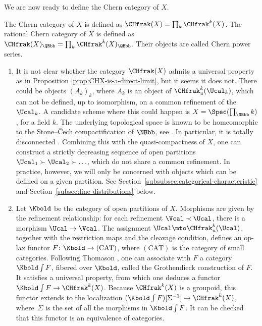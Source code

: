 We are now ready to define the Chern category of $X$.

\begin{definition}
The Chern category of $X$ is defined as $\CHfrak(X)=\prod_{k}\CHfrak^{k}(X)$. The rational Chern category of $X$ is defined as $\CHfrak(X)_{\QBbb}=\prod_{k}\CHfrak^{k}(X)_{\QBbb}$. Their objects are called Chern power series.
\end{definition}

\skpt
\begin{remark}\label{rmk:Grothendieck-construction}
\begin{enumerate}
\item\label{item:Grothendieck-construction-1} It is not clear whether the category $\CHfrak(X)$ admits a universal property as in Proposition \ref{prop:CHX-is-a-direct-limit}, but it seems it does not. There could be objects $(A_{k})_{k}$, where $A_{k}$ is an object of $\CHfrak^{k}_{u}(\Ucal_{k})$, which can not be defined, up to isomorphism, on a common refinement of the $\Ucal_{k}$. A candidate scheme where this could happen is $X=\Spec(\prod_{\NBbb}k)$, for a field $k$. The underlying topological space is known to be homeomorphic to the Stone--\v{C}ech compactification of $\NBbb$, see \cite[Ex.\,G, Chap.\,II]{Mumford-red}. In particular, it is totally disconnected \cite[\href{https://stacks.math.columbia.edu/tag/090C}{090C}]{stacks-project}. Combining this with the quasi-compactness of $X$, one can construct a strictly decreasing sequence of open partitions $\Ucal_{1}\succ\Ucal_{2}\succ\ldots$, which do not share a common refinement. In practice, however, we will only be concerned with objects which can be defined on a given partition. See Section~\ref{subsubsec:categorical-characteristic} and Section~\ref{subsec:line-distributions} below.
\item Let $\Kbold$ be the category of open partitions of $X$. Morphisms are given by the refinement relationship: for each refinement $\Vcal\prec\Ucal$, there is a morphism $\Ucal\to\Vcal$. The assignment $\Ucal\mto\CHfrak_{u}^{k}(\Ucal)$, together with the restriction maps and the cleavage condition, defines an op-lax functor $F\colon \Kbold\to\mathrm{(CAT)}$, where $\mathrm{(CAT)}$ is the category of small categories. Following Thomason \cite[\S 3]{ThomasonHomCol}, one can associate with $F$ a category $\Kbold\int F$, fibered over $\Kbold$, called the Grothendieck construction of $F$. It satisfies a universal property, from which one deduces a functor $\Kbold\int F\to\CHfrak^{k}(X)$. Because $\CHfrak^{k}(X)$ is a groupoid, this functor extends to the localization $(\Kbold\int F)[\Sigma^{-1}]\to\CHfrak^{k}(X)$, where~$\Sigma$ is the set of all the morphisms in $\Kbold\int F$. It can be checked that this functor is an equivalence of categories.
\end{enumerate}
\end{remark}

